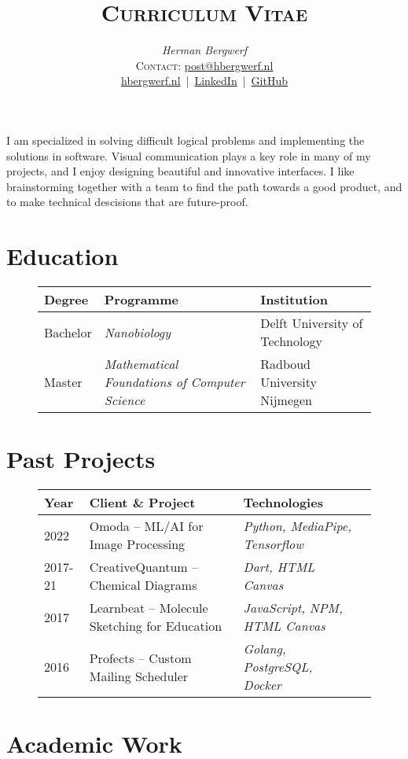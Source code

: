 \documentclass[a4paper,12pt]{article}
\date{}
\title{\textsc{Curriculum Vitae}}
\author{\emph{Herman Bergwerf}\\%
{\small \textsc{Contact:} \href{mailto:post@hbergwerf.nl}{post@hbergwerf.nl}}\\%
{\small
\href{https://www.hbergwerf.nl}{hbergwerf.nl}~|~\href{https://www.linkedin.com/in/hbergwerf/}{LinkedIn}~|~\href{https://github.com/bergwerf}{GitHub}
}}
\begin{document}
\maketitle
\noindent
I am specialized in solving difficult logical problems and implementing the solutions in software. Visual communication plays a key role in many of my projects, and I enjoy designing beautiful and innovative interfaces. I like brainstorming together with a team to find the path towards a good product, and to make technical descisions that are future-proof.

\section*{Education}

\begin{figure}[h]
\centering
\begin{tabular}{lll}
\toprule
{\bf Degree} & {\bf Programme} & {\bf Institution}\\
\midrule
Bachelor & \emph{Nanobiology} & Delft University of Technology\\
Master & \emph{Mathematical Foundations of Computer Science} & Radboud University Nijmegen\\
\bottomrule
\end{tabular}
\end{figure}

\section*{Past Projects}

\begin{figure}[h]
\centering
\begin{tabular}{llll}
\toprule
{\bfseries Year} & {\bfseries Client \& Project} & {\bfseries Technologies}\\
\midrule
2022 & Omoda -- ML/AI for Image Processing & \emph{Python, MediaPipe, Tensorflow}\\
2017-21 & CreativeQuantum -- Chemical Diagrams & \emph{Dart, HTML Canvas}\\
2017 & Learnbeat -- Molecule Sketching for Education & \emph{JavaScript, NPM, HTML Canvas}\\
2016 & Profects -- Custom Mailing Scheduler & \emph{Golang, PostgreSQL, Docker}\\
\bottomrule
\end{tabular}
\end{figure}

\section*{Academic Work}
\end{document}
